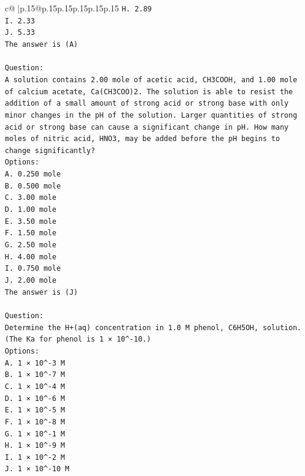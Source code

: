\documentclass{article}
\begin{document}
{\begin{supertabular}{c@{$\;$}|p{.15\linewidth}@{}p{.15\linewidth}p{.15\linewidth}p{.15\linewidth}p{.15\linewidth}p{.15\linewidth}}
{{{\texttt{H. 2.89} \\
\texttt{I. 2.33} \\
\texttt{J. 5.33} \\
\texttt{The answer is (A)} \\
\\ 
\texttt{Question:} \\
\texttt{A solution contains 2.00 mole of acetic acid, CH3COOH, and 1.00 mole of calcium acetate, Ca(CH3COO)2. The solution is able to resist the addition of a small amount of strong acid or strong base with only minor changes in the pH of the solution. Larger quantities of strong acid or strong base can cause a significant change in pH. How many moles of nitric acid, HNO3, may be added before the pH begins to change significantly?} \\
\texttt{Options:} \\
\texttt{A. 0.250 mole} \\
\texttt{B. 0.500 mole} \\
\texttt{C. 3.00 mole} \\
\texttt{D. 1.00 mole} \\
\texttt{E. 3.50 mole} \\
\texttt{F. 1.50 mole} \\
\texttt{G. 2.50 mole} \\
\texttt{H. 4.00 mole} \\
\texttt{I. 0.750 mole} \\
\texttt{J. 2.00 mole} \\
\texttt{The answer is (J)} \\
\\ 
\texttt{Question:} \\
\texttt{Determine the H+(aq) concentration in 1.0 M phenol, C6H5OH, solution. (The Ka for phenol is 1 × 10\^{}{-}10.)} \\
\texttt{Options:} \\
\texttt{A. 1 × 10\^{}{-}3 M} \\
\texttt{B. 1 × 10\^{}{-}7 M} \\
\texttt{C. 1 × 10\^{}{-}4 M} \\
\texttt{D. 1 × 10\^{}{-}6 M} \\
\texttt{E. 1 × 10\^{}{-}5 M} \\
\texttt{F. 1 × 10\^{}{-}8 M} \\
\texttt{G. 1 × 10\^{}{-}1 M} \\
\texttt{H. 1 × 10\^{}{-}9 M} \\
\texttt{I. 1 × 10\^{}{-}2 M} \\
\texttt{J. 1 × 10\^{}{-}10 M} \\
            }
        }
    }
     \\ \\


\end{supertabular}}
\end{document}
